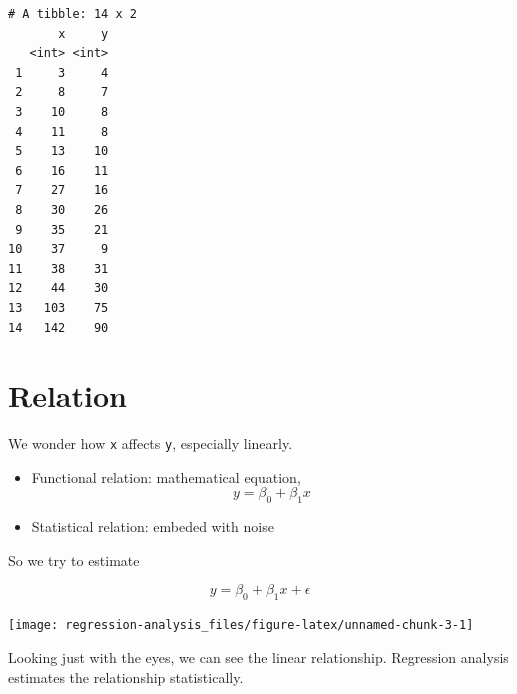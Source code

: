 \documentclass[]{book}
\newenvironment{Shaded}{\begin{snugshade}}{\end{snugshade}}
\newcommand{\DataTypeTok}[1]{\textcolor[rgb]{0.13,0.29,0.53}{#1}}
\newcommand{\KeywordTok}[1]{\textcolor[rgb]{0.13,0.29,0.53}{\textbf{#1}}}
\newcommand{\NormalTok}[1]{#1}
\newcommand{\OperatorTok}[1]{\textcolor[rgb]{0.81,0.36,0.00}{\textbf{#1}}}
\newcommand{\StringTok}[1]{\textcolor[rgb]{0.31,0.60,0.02}{#1}}
\providecommand{\tightlist}{%
  \setlength{\itemsep}{0pt}\setlength{\parskip}{0pt}}
\theoremstyle{definition}
\theoremstyle{definition}
\theoremstyle{definition}
\theoremstyle{remark}
\begin{document}
\begin{Shaded}
\end{Shaded}

\begin{verbatim}
# A tibble: 14 x 2
       x     y
   <int> <int>
 1     3     4
 2     8     7
 3    10     8
 4    11     8
 5    13    10
 6    16    11
 7    27    16
 8    30    26
 9    35    21
10    37     9
11    38    31
12    44    30
13   103    75
14   142    90
\end{verbatim}

\hypertarget{relation}{%
\section{Relation}\label{relation}}

We wonder how \texttt{x} affects \texttt{y}, especially linearly.

\begin{itemize}
\tightlist
\item
  Functional relation: mathematical equation, \[y = \beta_0 + \beta_1 x\]
\item
  Statistical relation: embeded with noise
\end{itemize}

So we try to estimate

\[y = \beta_0 + \beta_1 x + \epsilon\]

\begin{Shaded}
\end{Shaded}

\begin{center}\texttt{[image: regression-analysis\_files/figure-latex/unnamed-chunk-3-1]} \end{center}

Looking just with the eyes, we can see the linear relationship. Regression analysis estimates the relationship statistically.
\end{document}

